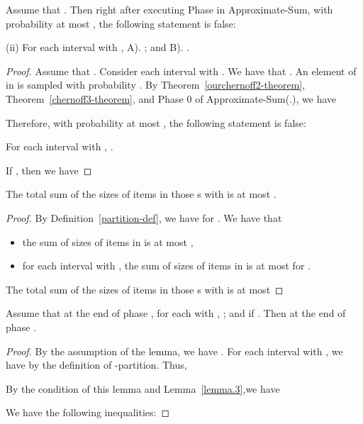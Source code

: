 \documentclass[runningheads]{llncs}
\begin{document}
\begin{lemma}\label{lemma.2}
Assume that . Then
right after executing Phase  in Approximate-Sum, with
probability at most , the
following statement is false:

(ii) For each interval  with , A). ; and B). .
\end{lemma}


\begin{proof}
Assume that .
Consider each interval  with . We have that . An element of  in  is sampled with probability
.  By Theorem~\ref{ourchernoff2-theorem},
Theorem~\ref{chernoff3-theorem}, and Phase 0 of Approximate-Sum(.),
we have


Therefore, with probability at most ,
the following statement is false:

For each interval  with ,
.



If , then we have

\end{proof}






\begin{lemma}\label{lemma.3}
The total sum of the sizes of items in those s with  is at most .
\end{lemma}


\begin{proof} By Definition~\ref{partition-def}, we have
 for . We have that
\begin{itemize}
\item
the sum of sizes of items in  is at most ,
\item
for each interval  with , the
sum of sizes of items in  is at most  for .
\end{itemize}
The total sum of the sizes of items in those s with   is at most

\end{proof}



\begin{lemma}\label{lemma.4}
Assume that at the end of phase , for each  with
, ; and  if . Then  at the end of phase .
\end{lemma}

\begin{proof} By the assumption of the lemma, we have . For each interval  with ,
we have  by the
definition of -partition.  Thus,


By the condition of this lemma and Lemma~\ref{lemma.3},we have



 We have the following inequalities:

\end{proof}
\end{document}
